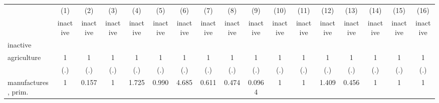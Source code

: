 {
\def\sym#1{\ifmmode^{#1}\else\(^{#1}\)\fi}
\begin{tabular}{l*{16}{c}}
\hline\hline
                    &\multicolumn{1}{c}{(1)}&\multicolumn{1}{c}{(2)}&\multicolumn{1}{c}{(3)}&\multicolumn{1}{c}{(4)}&\multicolumn{1}{c}{(5)}&\multicolumn{1}{c}{(6)}&\multicolumn{1}{c}{(7)}&\multicolumn{1}{c}{(8)}&\multicolumn{1}{c}{(9)}&\multicolumn{1}{c}{(10)}&\multicolumn{1}{c}{(11)}&\multicolumn{1}{c}{(12)}&\multicolumn{1}{c}{(13)}&\multicolumn{1}{c}{(14)}&\multicolumn{1}{c}{(15)}&\multicolumn{1}{c}{(16)}\\
                    &\multicolumn{1}{c}{inactive}&\multicolumn{1}{c}{inactive}&\multicolumn{1}{c}{inactive}&\multicolumn{1}{c}{inactive}&\multicolumn{1}{c}{inactive}&\multicolumn{1}{c}{inactive}&\multicolumn{1}{c}{inactive}&\multicolumn{1}{c}{inactive}&\multicolumn{1}{c}{inactive}&\multicolumn{1}{c}{inactive}&\multicolumn{1}{c}{inactive}&\multicolumn{1}{c}{inactive}&\multicolumn{1}{c}{inactive}&\multicolumn{1}{c}{inactive}&\multicolumn{1}{c}{inactive}&\multicolumn{1}{c}{inactive}\\
\hline
inactive            &                     &                     &                     &                     &                     &                     &                     &                     &                     &                     &                     &                     &                     &                     &                     &                     \\
agriculture         &           1         &           1         &           1         &           1         &           1         &           1         &           1         &           1         &           1         &           1         &           1         &           1         &           1         &           1         &           1         &           1         \\
                    &         (.)         &         (.)         &         (.)         &         (.)         &         (.)         &         (.)         &         (.)         &         (.)         &         (.)         &         (.)         &         (.)         &         (.)         &         (.)         &         (.)         &         (.)         &         (.)         \\
[1em]
manufactures, prim. &           1         &       0.157         &           1         &       1.725         &       0.990         &       4.685         &       0.611         &       0.474         &      0.0964         &           1         &           1         &       1.409         &       0.456         &           1         &           1         &           1         \\

\end{tabular}}
